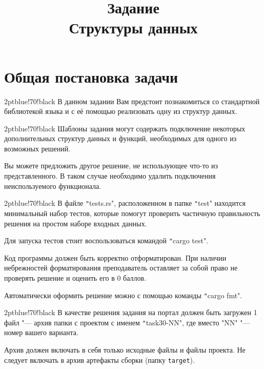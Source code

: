 \documentclass[a4paper, 10pt]{extarticle}
\begin{document}
\title{Задание \\ Структуры данных }
\author{}
\date{}
\maketitle

\section{Общая постановка задачи}

\begin{awesomeblock}{2pt}{\faTasks}{blue!70!black}
    В данном задании Вам предстоит познакомиться со стандартной библиотекой языка и с её помощью реализовать одну из структур данных.
\end{awesomeblock}

\begin{awesomeblock}{2pt}{\faTasks}{blue!70!black}
    Шаблоны задания могут содержать подключение некоторых дополнительных структур данных и функций, необходимых для одного из возможных решений. 
    
    Вы можете предложить другое решение, не использующее что-то из представленного. В таком случае необходимо удалить подключения неиспользуемого функционала.
\end{awesomeblock}

\begin{awesomeblock}{2pt}{\faTasks}{blue!70!black}
    В файле \texttt"tests.rs", расположенном в папке \texttt"test" находится минимальный набор тестов, которые помогут проверить частичную правильность решения на простом наборе входных данных.

    Для запуска тестов стоит воспользоваться командой \texttt"cargo test".
\end{awesomeblock}

\begin{importantblock}
    Код программы должен быть корректно отформатирован. При наличии небрежностей форматирования преподаватель оставляет за собой право  не проверять решение и оценить его в 0 баллов. 

    Автоматически оформить решение можно с помощью команды \texttt"cargo fmt".
\end{importantblock}

\begin{awesomeblock}{2pt}{\faFile}{blue!70!black}
    В качестве решения задания на портал должен быть загружен 1 файл "--- архив папки с проектом с именем \texttt"task30-NN", где вместо \smlinline"NN" "--- номер вашего варианта.
    
    Архив должен включать в себя только исходные файлы и файлы проекта. Не следует включать в архив артефакты сборки (папку \verb|target|).
\end{awesomeblock}
\end{document}
